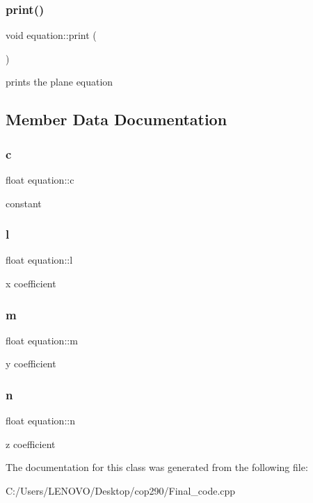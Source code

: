 \subsubsection{print()}
{\footnotesize\ttfamily void equation\+::print (\begin{DoxyParamCaption}{ }\end{DoxyParamCaption})\hspace{0.3cm}{\ttfamily [inline]}}

prints the plane equation 

\subsection{Member Data Documentation}
\mbox{\label{classequation_aef4b55534f13a8f98b4bcc912a82010f}} 
\subsubsection{c}
{\footnotesize\ttfamily float equation\+::c}

constant \mbox{\label{classequation_ad043d060089390679c79047ac92c37a4}} 
\subsubsection{l}
{\footnotesize\ttfamily float equation\+::l}

x coefficient \mbox{\label{classequation_a72f1b0316dfb324fd7aeb9280da42ce5}} 
\subsubsection{m}
{\footnotesize\ttfamily float equation\+::m}

y coefficient \mbox{\label{classequation_a515d915d17fba84837a23a5cca2e34fe}} 
\subsubsection{n}
{\footnotesize\ttfamily float equation\+::n}

z coefficient 

The documentation for this class was generated from the following file\+:\begin{DoxyCompactItemize}
\item 
C\+:/\+Users/\+L\+E\+N\+O\+V\+O/\+Desktop/cop290/Final\+\_\+code.\+cpp\end{DoxyCompactItemize}
